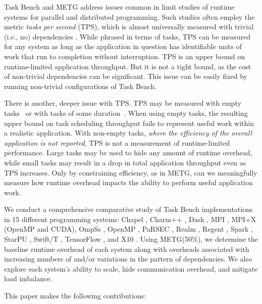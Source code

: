 %
%
Task Bench and METG address issues common in limit studies of runtime
systems for parallel and distributed programming. Such studies often
employ the metric \emph{tasks per second} (TPS), which is almost
universally measured with trivial (i.e., no) dependencies \cite{LegionTracing18, Canary16, Armstrong14}. While
phrased in terms of tasks, TPS can be measured for any system as long
as the application in question has identifiable units of work that run
to completion without interruption. TPS is an upper bound on
runtime-limited application throughput. But it is not a tight bound, as the
cost of non-trivial dependencies can be significant. This issue can be easily fixed by running non-trivial
configurations of Task Bench.

There is another, deeper issue with TPS. TPS may be measured with
empty tasks~\cite{LegionTracing18} or with tasks of some
duration~\cite{Canary16, Armstrong14}. When using empty tasks, the
resulting upper bound on task scheduling throughput fails to represent
useful work within a realistic application. With non-empty tasks,
\emph{where the efficiency of the overall application is not
 reported}, TPS is not a measurement of runtime-limited
performance. Large tasks may be used to hide any amount of runtime
overhead, while small tasks may result in a drop in total
application throughput even as TPS increases. Only by constraining
efficiency, as in METG, can we meaningfully measure how runtime
overhead impacts the ability to perform useful application work.

We conduct a comprehensive comparative study of Task Bench
implementations in 15 different programming systems:
Chapel \cite{Chapel15}, Charm++ \cite{Charmpp93}, Dask \cite{Dask15}, MPI \cite{MPI}, MPI+X (OpenMP and CUDA),
OmpSs \cite{OmpSs11}, OpenMP \cite{OpenMPSpec40},
PaRSEC \cite{PARSEC13}, Realm \cite{Realm14}, Regent \cite{Regent15},
Spark \cite{Spark10}, StarPU \cite{StarPU11},
Swift/T \cite{Wozniak13}, TensorFlow \cite{TensorFlow15}, and
X10 \cite{X1005}. Using METG(50\%), we determine the baseline
runtime overhead of each system along with overheads associated with
increasing numbers of and/or variations in the pattern of dependencies. We
also explore each system's ability to scale, hide communication
overhead, and mitigate load imbalance.

This paper makes the following contributions:

